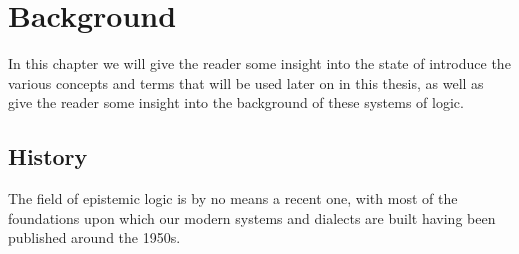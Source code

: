 \section{Background}\label{sec:back}

In this chapter we will give the reader some insight into the state of 
introduce the various concepts and terms that will be used later on in this thesis, as well as give the reader some insight into the background of these systems of logic.


\subsection{History}


%



The field of epistemic logic is by no means a recent one, with most of the foundations upon which our modern systems and dialects are built having been published around the 1950s.\cite{StanfordEpiLogic}



